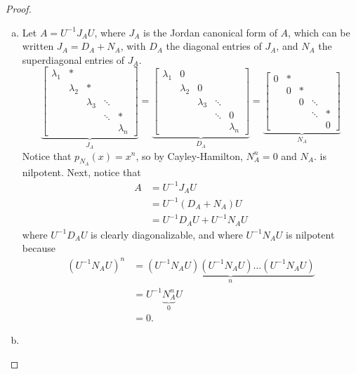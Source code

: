 \documentclass{article}
\begin{document}
\begin{proof} ~
  \begin{enumerate}[(a)]
    \item   Let $A = U^{-1} J_A U$, where $J_A$ is the Jordan canonical form of $A$, which
      can be written $J_A = D_A + N_A$, with $D_A$ the diagonal entries of $J_A$,
      and $N_A$ the superdiagonal entries of $J_A$. \[
        \underbrace{
          \begin{bmatrix}
            \lambda_1 & * & \ & \ & \ \\
            \ & \lambda_2 & * & \ & \ \\
            \ & \ & \lambda_3 & \ddots & \ \\
            \ & \ & \ & \ddots & * \\
            \ & \ & \ & \ & \lambda_n
          \end{bmatrix}
        }_{J_A}
        = \underbrace{
          \begin{bmatrix}
            \lambda_1 & 0         & \         & \      & \ \\
            \         & \lambda_2 & 0         & \      & \ \\
            \         & \         & \lambda_3 & \ddots & \ \\
            \         & \         & \         & \ddots & 0 \\
            \         & \         & \         & \      & \lambda_n
          \end{bmatrix}
        }_{D_A}
        = \underbrace{
          \begin{bmatrix}
            0 & * & \ & \      & \ \\
            \ & 0 & * & \      & \ \\
            \ & \ & 0 & \ddots & \ \\
            \ & \ & \ & \ddots & * \\
            \ & \ & \ & \      & 0
          \end{bmatrix}
        }_{N_A}
      \]
      Notice that $p_{N_A}(x) = x^n$, so by Cayley-Hamilton, $N_A^n = 0$ and $N_A$.
      is nilpotent.
      Next, notice that \begin{align*}
        A
        &= U^{-1} J_A U \\
        &= U^{-1} (D_A + N_A) U \\
        &= U^{-1} D_A U + U^{-1} N_A U
      \end{align*} where $U^{-1} D_A U$ is clearly diagonalizable, and where
      $U^{-1} N_A U$ is nilpotent because \begin{align*}
        (U^{-1} N_A U)^n
          &= \underbrace{(U^{-1} N_A U)(U^{-1} N_A U)\hdots(U^{-1} N_A U)}_{n} \\
          &= U^{-1} \underbrace{N_A^n}_0 U \\
          &= 0.
      \end{align*}
    \item
  \end{enumerate}
\end{proof}
\end{document}
